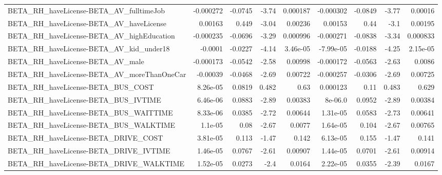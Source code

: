 \begin{tabular}{lrrrrrrrr}
BETA\_RH\_haveLicense-BETA\_AV\_fulltimeJob            &   -0.000272 &      -0.0745 &    -3.74 & 0.000187 &  -0.000302 &     -0.0849 &        -3.77 &       0.00016 \\
BETA\_RH\_haveLicense-BETA\_AV\_haveLicense            &     0.00163 &        0.449 &    -3.04 &  0.00236 &    0.00153 &        0.44 &         -3.1 &       0.00195 \\
BETA\_RH\_haveLicense-BETA\_AV\_highEducation          &   -0.000235 &      -0.0696 &    -3.29 & 0.000996 &  -0.000271 &     -0.0838 &        -3.34 &      0.000833 \\
BETA\_RH\_haveLicense-BETA\_AV\_kid\_under18            &     -0.0001 &      -0.0227 &    -4.14 & 3.46e-05 &  -7.99e-05 &     -0.0188 &        -4.25 &      2.15e-05 \\
BETA\_RH\_haveLicense-BETA\_AV\_male                   &   -0.000173 &      -0.0542 &    -2.58 &  0.00998 &  -0.000172 &     -0.0563 &        -2.63 &        0.0086 \\
BETA\_RH\_haveLicense-BETA\_AV\_moreThanOneCar         &    -0.00039 &      -0.0468 &    -2.69 &  0.00722 &  -0.000257 &     -0.0306 &        -2.69 &       0.00725 \\
BETA\_RH\_haveLicense-BETA\_BUS\_COST                  &    8.26e-05 &       0.0819 &    0.482 &     0.63 &   0.000123 &        0.11 &        0.483 &         0.629 \\
BETA\_RH\_haveLicense-BETA\_BUS\_IVTIME                &    6.46e-06 &       0.0883 &    -2.89 &  0.00383 &    8e-06.0 &      0.0952 &        -2.89 &       0.00384 \\
BETA\_RH\_haveLicense-BETA\_BUS\_WAITTIME              &    8.33e-06 &       0.0385 &    -2.72 &  0.00644 &   1.31e-05 &      0.0583 &        -2.73 &       0.00641 \\
BETA\_RH\_haveLicense-BETA\_BUS\_WALKTIME              &     1.1e-05 &         0.08 &    -2.67 &   0.0077 &   1.64e-05 &       0.104 &        -2.67 &       0.00765 \\
BETA\_RH\_haveLicense-BETA\_DRIVE\_COST                &    3.81e-05 &        0.113 &    -1.47 &    0.142 &   6.13e-05 &       0.155 &        -1.47 &         0.141 \\
BETA\_RH\_haveLicense-BETA\_DRIVE\_IVTIME              &    1.46e-05 &       0.0767 &    -2.61 &  0.00907 &   1.44e-05 &      0.0701 &        -2.61 &       0.00914 \\
BETA\_RH\_haveLicense-BETA\_DRIVE\_WALKTIME            &    1.52e-05 &       0.0273 &     -2.4 &   0.0164 &   2.22e-05 &      0.0355 &        -2.39 &        0.0167 \\

\end{tabular}
